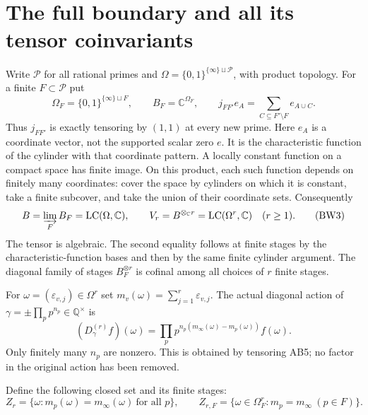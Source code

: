 \documentclass[11pt]{article}
\newcommand{\C}{\mathbb C}
\newcommand{\Q}{\mathbb Q}
\newcommand{\LC}{\operatorname{LC}}
\newcommand{\eps}{\varepsilon}
\begin{document}
\section{The full boundary and all its tensor coinvariants}
Write $\mathcal P$ for all rational primes and
$\Omega=\{0,1\}^{\{\infty\}\sqcup\mathcal P}$, with product topology.
For a finite $F\subset\mathcal P$ put
\[
 \Omega_F=\{0,1\}^{\{\infty\}\sqcup F},\qquad
 B_F=\C^{\Omega_F},\qquad
 j_{FF'}e_A=\sum_{C\subseteq F'\setminus F}e_{A\cup C}.
 \tag{BW2}
\]
Thus $j_{FF'}$ is exactly tensoring by $(1,1)$ at every new prime.
Here $e_A$ is a coordinate vector, not the supported scalar zero $e$.
It is the characteristic function of the cylinder with that coordinate
pattern. A locally constant function on a compact space has finite
image. On this product, each such function depends on finitely many
coordinates: cover the space by cylinders on which it is constant,
take a finite subcover, and take the union of their coordinate sets.
Consequently
\[
 B=\varinjlim_F B_F=\LC(\Omega,\C),\qquad
 V_r=B^{\otimes_\C r}=\LC(\Omega^r,\C)\quad(r\ge1).
 \tag{BW3}
\]
The tensor is algebraic. The second equality follows at finite stages
by the characteristic-function bases and then by the same finite
cylinder argument. The diagonal family of stages $B_F^{\otimes r}$
is cofinal among all choices of $r$ finite stages.

For $\omega=(\eps_{v,j})\in\Omega^r$ set
$m_v(\omega)=\sum_{j=1}^r\eps_{v,j}$. The actual diagonal action of
$\gamma=\pm\prod_pp^{n_p}\in\Q^\times$ is
\[
 (D_\gamma^{(r)}f)(\omega)=
 \prod_p p^{n_p(m_\infty(\omega)-m_p(\omega))}f(\omega).
 \tag{BW4}
\]
Only finitely many $n_p$ are nonzero. This is obtained by tensoring
AB5; no factor in the original action has been removed.

Define the following closed set and its finite stages:
\[
 Z_r=\{\omega:m_p(\omega)=m_\infty(\omega)\ \text{for all }p\},
 \qquad Z_{r,F}=\{\omega\in\Omega_F^r:m_p=m_\infty\ (p\in F)\}.
 \tag{BW5}
\]
\end{document}
